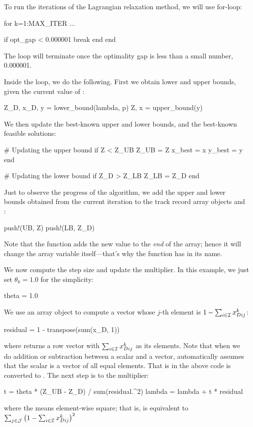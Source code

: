 To run the iterations of the Lagrangian relaxation method, we will use for-loop:
\begin{code}
for k=1:MAX_ITER
	...

    if opt_gap < 0.000001
        break
    end
end
\end{code}
\noindent The loop will terminate once the optimality gap  is less than a small number, 0.000001.

Inside the loop, we do the following. First we obtain lower and upper bounds, given the current value of :
\begin{code}
    Z_D, x_D, y = lower_bound(lambda, p)
    Z, x = upper_bound(y)
\end{code}
\noindent We then update the best-known upper and lower bounds, and the best-known feasible solutions:
\begin{code}
    # Updating the upper bound
    if Z < Z_UB
        Z_UB = Z
        x_best = x
        y_best = y
    end

    # Updating the lower bound
    if Z_D > Z_LB
        Z_LB = Z_D
    end
\end{code}
\noindent Just to observe the progress of the algorithm, we add the upper and lower bounds obtained from the current iteration to the track record array objects  and :
\begin{code}
    push!(UB, Z)
    push!(LB, Z_D)
\end{code}
\noindent Note that the function  adds the new value to the \emph{end} of the array; hence it will change the array variable itself---that's why the function has \kode{!} in its name.

We now compute the step size and update the multiplier. In this example, we just set $\theta_k = 1.0$ for the simplicity:
\begin{code}
	theta = 1.0
\end{code}
\noindent We use an array object  to compute a vector whose $j$-th element is $1-\sum_{i\in\mathcal{I}}x^k_{Dij}$:
\begin{code}
	residual = 1 - transpose(sum(x_D, 1))
\end{code}
\noindent where  returns a row vector with $\sum_{i\in\mathcal{I}}x^k_{Dij}$ as its elements. Note that when we do addition or subtraction between a scalar and a vector, \julia{} automatically assumes that the scalar is a vector of all equal elements. That is  in the above code is converted to . The next step is to the multiplier:
\begin{code}
    t = theta * (Z_UB - Z_D) / sum(residual.^2)
    lambda = lambda + t * residual
\end{code}
\noindent where the  means element-wise square; that is,  is equivalent to $\sum_{j\in\mathcal{J}} \big( 1 - \sum_{i\in\mathcal{I}} x_{Dij}^k \big)^2$


